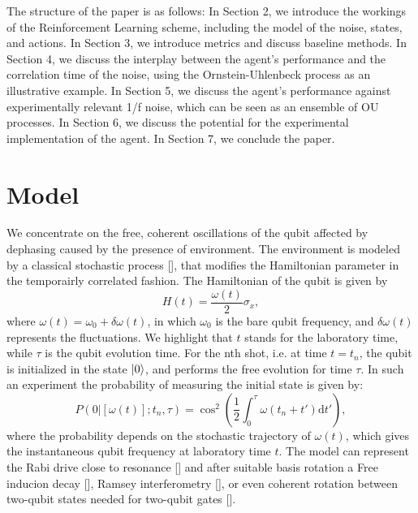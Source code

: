 \documentclass[aps,twocolumn,pra,notitlepage,]{revtex4-2}
\begin{document}
The structure of the paper is as follows: In Section 2, we introduce the workings of the Reinforcement Learning scheme, including the model of the noise, states, and actions. In Section 3, we introduce metrics and discuss baseline methods. In Section 4, we discuss the interplay between the agent's performance and the correlation time of the noise, using the Ornstein-Uhlenbeck process as an illustrative example. In Section 5, we discuss the agent's performance against experimentally relevant 1/f noise, which can be seen as an ensemble of OU processes. In Section 6, we discuss the potential for the experimental implementation of the agent. In Section 7, we conclude the paper.

\section{Model}
We concentrate on the free, coherent oscillations of the qubit affected by dephasing caused by the presence of environment. The environment is modeled by a classical stochastic process [], that modifies the Hamiltonian parameter in the temporairly correlated fashion. The Hamiltonian of the qubit is given by
\begin{equation}
H(t) = \frac{\omega(t)}{2} \sigma_x,
\end{equation}
where $\omega(t) = \omega_0 + \delta \omega(t)$, in which \( \omega_0 \) is the bare qubit frequency, and \( \delta \omega(t) \) represents the fluctuations. We highlight that $t$ stands for the laboratory time, while $\tau$ is the qubit evolution time. For the nth shot, i.e. at time $t = t_n$, the qubit is initialized in the state \( \ket{0} \), and performs the free evolution for time \( \tau \). In such an experiment the probability of measuring the initial state is given by:
\begin{equation}
P(0|[\omega(t)];t_n,\tau) = \cos^2\left(\frac{1}{2}\int_{0}^{\tau} \omega(t_n+t') \text{d}t'\right),
\end{equation}
where the probability depends on the stochastic trajectory of $\omega(t)$, which gives the instantaneous qubit frequency at laboratory time $t$. The model can represent the Rabi drive close to resonance [] and after suitable basis rotation a Free inducion decay [], Ramsey interferometry [], or even coherent rotation between two-qubit states needed for two-qubit gates []. 
\end{document}
